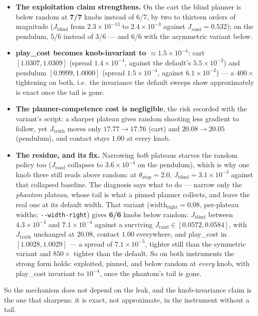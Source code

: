 \documentclass[11pt]{article}
\theoremstyle{definition}
\theoremstyle{remark}
\begin{document}
\begin{itemize}
\item \textbf{The exploitation claim strengthens.} On the cart the blind planner is below random at \textbf{7/7} knobs instead of 6/7, by two to thirteen orders of magnitude ($J_\mathrm{blind}$ from $2.3\times10^{-13}$ to $2.4\times10^{-3}$ against $J_\mathrm{rand} = 0.532$); on the pendulum, 5/6 instead of 3/6 --- and 6/6 with the asymmetric variant below.
\item \textbf{play\_cost becomes knob-invariant to ${\approx}1.5\times10^{-4}$}: cart $[1.0307, 1.0309]$ (spread $1.4\times10^{-4}$, against the default's $5.5\times10^{-2}$) and pendulum $[0.9999, 1.0000]$ (spread $1.5\times10^{-4}$, against $6.1\times10^{-2}$) --- a $400\times$ tightening on both, i.e.\ the invariance the default sweeps show approximately is exact once the tail is gone.
\item \textbf{The planner-competence cost is negligible}, the risk recorded with the variant's script: a sharper plateau gives random shooting less gradient to follow, yet $J_\mathrm{truth}$ moves only $17.77 \to 17.76$ (cart) and $20.08 \to 20.05$ (pendulum), and contact stays $1.00$ at every knob.
\item \textbf{The residue, and its fix.} Narrowing \emph{both} plateaus starves the random policy too ($J_\mathrm{rand}$ collapses to $3.6\times10^{-4}$ on the pendulum), which is why one knob there still reads above random: at $\theta_\mathrm{stop} = 2.0$, $J_\mathrm{blind} = 3.1\times10^{-3}$ against that collapsed baseline. The diagnosis says what to do --- narrow only the \emph{phantom} plateau, whose tail is what a pinned planner collects, and leave the real one at its default width. That variant ($\mathrm{width}_\mathrm{right} = 0.08$, per-plateau widths; \texttt{-{}-width-right}) gives \textbf{6/6} knobs below random: $J_\mathrm{blind}$ between $4.3\times10^{-4}$ and $7.1\times10^{-4}$ against a surviving $J_\mathrm{rand} \in [0.0572, 0.0584]$, with $J_\mathrm{truth}$ unchanged at $20.08$, contact $1.00$ everywhere, and play\_cost in $[1.0028, 1.0029]$ --- a spread of $7.1\times10^{-5}$, tighter still than the symmetric variant and $850\times$ tighter than the default. So on both instruments the strong form holds: exploited, pinned, and below random at \emph{every} knob, with play\_cost invariant to $10^{-4}$, once the phantom's tail is gone.
\end{itemize}
So the mechanism does not depend on the leak, and the knob-invariance claim is the one that sharpens: it is exact, not approximate, in the instrument without a tail.
\end{document}
